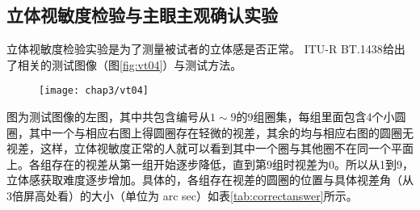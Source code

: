 \subsection{立体视敏度检验与主眼主观确认实验}
\label{sec:stereoacuitytest}
立体视敏度检验实验是为了测量被试者的立体感是否正常。 ITU-R  BT.1438\parencite{recommendation1438}给出了相关的测试图像（图\ref{fig:vt04}）与测试方法。
\begin{figure}[ht]
  \centering
  \texttt{[image: chap3/vt04]}
\end{figure}
图为测试图像的左图，其中共包含编号从$1 \sim 9$的9组圈集，每组里面包含4个小圆圈，其中一个与相应右图上得圆圈存在轻微的视差，其余的均与相应右图的圆圈无视差，这样，立体视敏度正常的人就可以看到其中一个圈与其他圈不在同一个平面上。各组存在的视差从第一组开始逐步降低，直到第9组时视差为0。所以从1到9，立体感获取难度逐步增加。具体的，各组存在视差的圆圈的位置与具体视差角（从3倍屏高处看）的大小（单位为 arc sec）如表\ref{tab:correctanswer}所示。
